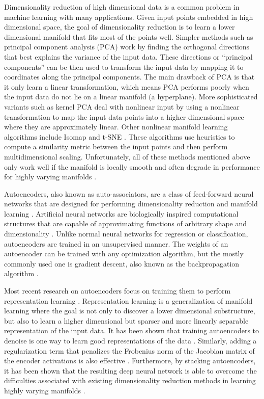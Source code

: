 Dimensionality reduction of high dimensional data is a common problem in machine learning with many applications. Given input points embedded in high dimensional space, the goal of dimensionality reduction is to learn a lower dimensional manifold that fits most of the points well. Simpler methods such as principal component analysis (PCA) \cite{wold1987principal} work by finding the orthogonal directions that best explains the variance of the input data. These directions or ``principal components'' can be then used to transform the input data by mapping it to coordinates along the principal components. The main drawback of PCA is that it only learn a linear transformation, which means PCA performs poorly when the input data do not lie on a linear manifold (a hyperplane). More sophisticated variants such as kernel PCA \cite{scholkopf1997kernel} deal with nonlinear input by using a nonlinear transformation to map the input data points into a higher dimensional space where they are approximately linear. Other nonlinear manifold learning algorithms include Isomap \cite{tenenbaum2000global} and t-SNE \cite{van2008visualizing}. These algorithms use heuristics to compute a similarity metric between the input points and then perform multidimensional scaling. Unfortunately, all of these methods mentioned above only work well if the manifold is locally smooth and often degrade in performance for highly varying manifolds \cite{van2008visualizing}.

Autoencoders, also known as auto-associators, are a class of feed-forward neural networks that are designed for performing dimensionality reduction and manifold learning \cite{hinton2006reducing}. Artificial neural networks are biologically inspired computational structures that are capable of approximating functions of arbitrary shape and dimensionality \cite{haykin2004comprehensive}. Unlike normal neural networks for regression or classification, autoencoders are trained in an unsupervised manner. The weights of an autoencoder can be trained with any optimization algorithm, but the mostly commonly used one is gradient descent, also known as the backpropagation algorithm \cite{hecht1989theory,bottou-91c}. 

Most recent research on autoencoders focus on training them to perform representation learning \cite{bengio2012rep}. Representation learning is a generalization of manifold learning where the goal is not only to discover a lower dimensional substructure, but also to learn a higher dimensional but sparser and more linearly separable representation of the input data. It has been shown that training autoencoders to denoise is one way to learn good representations of the data \cite{vincent2010stacked}. Similarly, adding a regularization term that penalizes the Frobenius norm of the Jacobian matrix of the encoder activations is also effective \cite{rifai2011contractive}. Furthermore, by stacking autoencoders, it has been shown that the resulting deep neural network is able to overcome the difficulties associated with existing dimensionality reduction methods in learning highly varying manifolds \cite{van2008visualizing,vincent2010stacked}.

